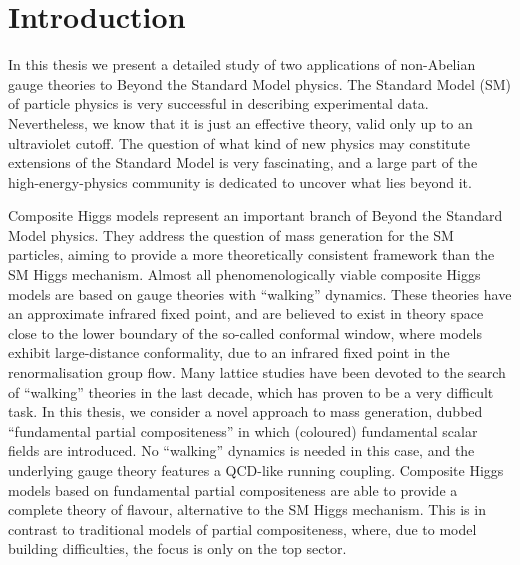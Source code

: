 \chapter{Introduction}

In this thesis we present a detailed study of two applications of non-Abelian gauge theories to Beyond the Standard Model physics.
The Standard Model (SM) of particle physics is very successful in describing experimental data. Nevertheless, we know that it is just an effective theory, valid only up to an ultraviolet cutoff. 
The question of what kind of new physics may constitute extensions of the Standard Model is very fascinating, and a large part of the high-energy-physics community is dedicated to uncover what lies beyond it. 

Composite Higgs models represent an important branch of Beyond the Standard Model physics. They address the question of mass generation for the SM particles,
aiming to provide a more theoretically consistent framework than the SM Higgs mechanism. 
Almost all phenomenologically viable composite Higgs models are based on gauge theories with  ``walking'' dynamics. These theories have an approximate infrared fixed point, and are believed to exist in theory space close to the lower boundary of the so-called conformal window, where models exhibit large-distance conformality, due to an infrared fixed point in the renormalisation group flow. 
Many lattice studies have been devoted to the search of ``walking'' theories in the last decade, which has proven to be a very difficult task.
In this thesis, we consider a novel approach to mass generation, dubbed ``fundamental partial compositeness'' \cite{Sannino:2016sfx} in which (coloured) fundamental scalar fields are introduced.  No ``walking'' dynamics is needed in this case, and the underlying gauge theory features a QCD-like running coupling. Composite Higgs models based on fundamental partial compositeness are able to provide a complete theory of flavour, alternative to the SM Higgs mechanism. This is in contrast to traditional models of partial compositeness, where, due to model building difficulties, the focus is only on the top sector.

